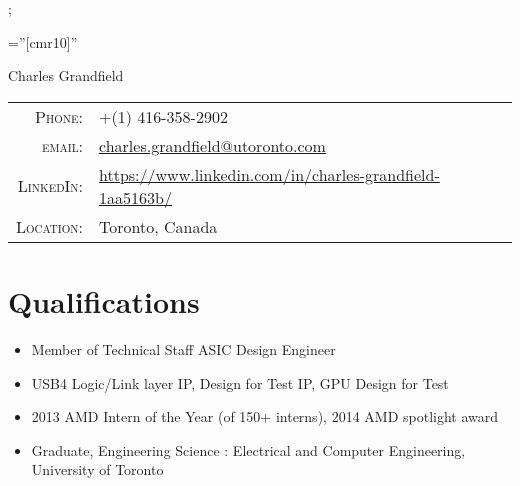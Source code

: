 \documentclass[a4paper,10pt]{article}
\begin{document}
;

\hspace{-0.75cm}
\makebox[0pt][s]{%
  \raisebox{-\totalheight}[0pt][0pt]{%
``  \begin{tikzpicture}
	\draw[draw=white,fill=white, opacity=0.9] (0,0) rectangle ++(\paperwidth-2cm,\paperheight-4cm);
    \end{tikzpicture}
  }
}%

\pagestyle{empty} %

\font\fb=''[cmr10]'' %



\par{\centering
		{\Huge Charles Grandfield
	}\par}

\vspace{1ex}

\begin{tabular}{rl}

    \textsc{Phone:}      & +(1) 416-358-2902\\
    \textsc{email:}        & \href{mailto:charles.grandfield@utoronto.com}{charles.grandfield@utoronto.com}\\
    \textsc{LinkedIn:}   &  \href{https://www.linkedin.com/in/charles-grandfield-1aa5163b/}{https://www.linkedin.com/in/charles-grandfield-1aa5163b/} \\
    \textsc{Location:}   &  Toronto, Canada 
\end{tabular}

\vspace{1ex}

\section{Qualifications}
\begin{itemize}
	\item Member of Technical Staff ASIC Design Engineer
	\item USB4 Logic/Link layer IP, Design for Test IP, GPU Design for Test
	\item 2013 AMD Intern of the Year (of 150+ interns), 2014 AMD spotlight award
	\item Graduate, Engineering Science : Electrical and Computer Engineering, University of Toronto
\end{itemize}
\end{document}
